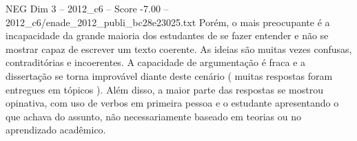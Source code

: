 \begin{textsample}{NEG Dim 3 – 2012\_c6 – Score -7.00 – 2012\_c6/enade\_2012\_publi\_bc28e23025.txt}
Porém, o mais preocupante é a incapacidade da grande maioria dos estudantes de se fazer entender e não se mostrar capaz de escrever um texto coerente.
As ideias são muitas vezes confusas, contraditórias e incoerentes.
A capacidade de argumentação é fraca e a dissertação se torna improvável diante deste cenário ( muitas respostas foram entregues em tópicos ).
Além disso, a maior parte das respostas se mostrou opinativa, com uso de verbos em primeira pessoa e o estudante apresentando o que achava do assunto, não necessariamente baseado em teorias ou no aprendizado acadêmico.

\end{textsample}
